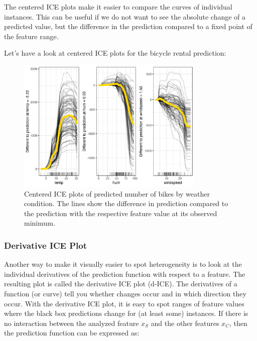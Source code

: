 \documentclass[
  11pt,
]{scrbook}
\begin{document}
The centered ICE plots make it easier to compare the curves of individual instances.
This can be useful if we do not want to see the absolute change of a predicted value, but the difference in the prediction compared to a fixed point of the feature range.

Let's have a look at centered ICE plots for the bicycle rental prediction:

\begin{figure}

{\centering \includegraphics[width=0.8\textwidth]{images/ice-bike-centered-1} 

}

\caption{Centered ICE plots of predicted number of bikes by weather condition. The lines show the difference in prediction compared to the prediction with the respective feature value at its observed minimum.}\label{fig:ice-bike-centered}
\end{figure}

\hypertarget{derivative-ice-plot}{%
\subsubsection{Derivative ICE Plot}\label{derivative-ice-plot}}

Another way to make it visually easier to spot heterogeneity is to look at the individual derivatives of the prediction function with respect to a feature.
The resulting plot is called the derivative ICE plot (d-ICE).
The derivatives of a function (or curve) tell you whether changes occur and in which direction they occur.
With the derivative ICE plot, it is easy to spot ranges of feature values where the black box predictions change for (at least some) instances.
If there is no interaction between the analyzed feature \(x_S\) and the other features \(x_C\), then the prediction function can be expressed as:
\end{document}
